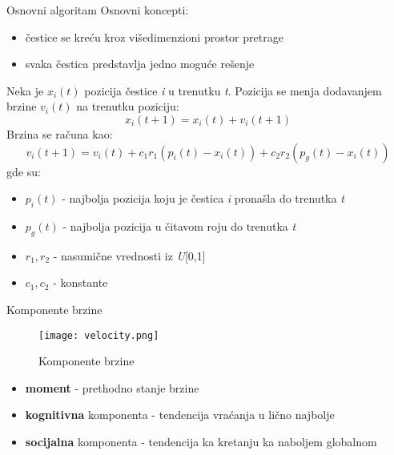 \documentclass{beamer}
\begin{document}
\begin{frame}{Osnovni algoritam}
Osnovni koncepti:
\begin{itemize}
    \item čestice se kreću kroz višedimenzioni prostor pretrage
    \item svaka čestica predstavlja jedno moguće rešenje
\end{itemize}

Neka je $x_i(t)$ pozicija čestice \textit{i} u trenutku \textit{t}. Pozicija se menja dodavanjem brzine $v_i(t)$ na trenutku poziciju:
\[ x_i(t+1) = x_i(t) + v_i(t+1) \]
Brzina se računa kao:
\[ v_i(t+1) = v_i(t) + c_1r_1(p_i(t) - x_i(t)) + c_2r_2(p_g(t) - x_i(t))\] gde su:

\begin{itemize}
    \item $p_i(t)$ - najbolja pozicija koju je čestica \textit{i} pronašla do trenutka \textit{t}
    \item $p_g(t)$ - najbolja pozicija u čitavom roju do trenutka \textit{t}
    \item $r_1, r_2$ - nasumične vrednosti iz \textit{U}[0,1]
    \item $c_1, c_2$ - konstante
\end{itemize}

\end{frame}


\begin{frame}{Komponente brzine}
    \begin{figure}[htp]
    \centering
    \texttt{[image: velocity.png]}
    \caption{Komponente brzine}
    \label{fig:velocity}
\end{figure}

\begin{itemize}
    \item \textbf{moment} - prethodno stanje brzine
    \item \textbf{kognitivna} komponenta - tendencija vraćanja u lično najbolje
    \item \textbf{socijalna} komponenta - tendencija ka kretanju ka naboljem globalnom
\end{itemize}
\end{frame}
\end{document}
